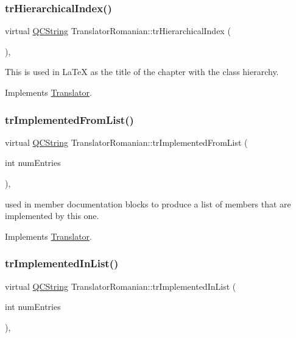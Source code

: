 \subsubsection{\texorpdfstring{trHierarchicalIndex()}{trHierarchicalIndex()}}
{\footnotesize\ttfamily virtual \mbox{\hyperlink{class_q_c_string}{Q\+C\+String}} Translator\+Romanian\+::tr\+Hierarchical\+Index (\begin{DoxyParamCaption}{ }\end{DoxyParamCaption})\hspace{0.3cm}{\ttfamily [inline]}, {\ttfamily [virtual]}}

This is used in La\+TeX as the title of the chapter with the class hierarchy. 

Implements \mbox{\hyperlink{class_translator}{Translator}}.

\mbox{\label{class_translator_romanian_a4191c132998acebb780384ee9b319577}} 
\subsubsection{\texorpdfstring{trImplementedFromList()}{trImplementedFromList()}}
{\footnotesize\ttfamily virtual \mbox{\hyperlink{class_q_c_string}{Q\+C\+String}} Translator\+Romanian\+::tr\+Implemented\+From\+List (\begin{DoxyParamCaption}\item[{int}]{num\+Entries }\end{DoxyParamCaption})\hspace{0.3cm}{\ttfamily [inline]}, {\ttfamily [virtual]}}

used in member documentation blocks to produce a list of members that are implemented by this one. 

Implements \mbox{\hyperlink{class_translator}{Translator}}.

\mbox{\label{class_translator_romanian_a9b547b861c58cbf89fc0b8207f713957}} 
\subsubsection{\texorpdfstring{trImplementedInList()}{trImplementedInList()}}
{\footnotesize\ttfamily virtual \mbox{\hyperlink{class_q_c_string}{Q\+C\+String}} Translator\+Romanian\+::tr\+Implemented\+In\+List (\begin{DoxyParamCaption}\item[{int}]{num\+Entries }\end{DoxyParamCaption})\hspace{0.3cm}{\ttfamily [inline]}, {\ttfamily [virtual]}}

